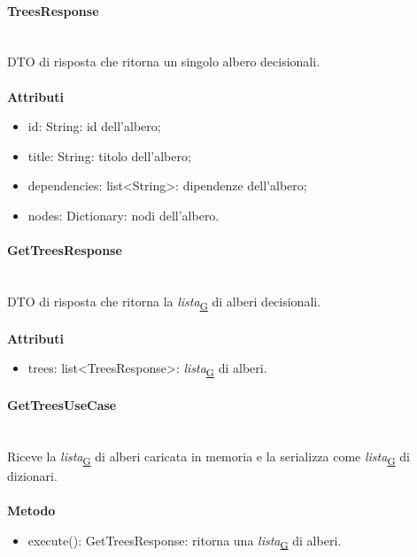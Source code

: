\documentclass[a4paper,12pt]{article}
\begin{document}
                \paragraph{TreesResponse}\mbox{}\\
                    DTO di risposta che ritorna un singolo albero decisionali.\\\\
                    \textbf{Attributi}
                    \begin{itemize}
                        \item {\ttfamily id: String}: id dell'albero;
                        \item {\ttfamily title: String}: titolo dell'albero;
                        \item {\ttfamily dependencies: list<String>}: dipendenze dell'albero;
                        \item {\ttfamily nodes: Dictionary}: nodi dell'albero.
                    \end{itemize}

                \paragraph{GetTreesResponse}\mbox{}\\
                    DTO di risposta che ritorna la \textit{lista}\textsubscript{\href{https://atlasteam9.github.io/Atlas/glossario.html\#Lista}{G}} di alberi decisionali.\\\\
                    \textbf{Attributi}
                    \begin{itemize}
                        \item {\ttfamily trees: list<TreesResponse>}: \textit{lista}\textsubscript{\href{https://atlasteam9.github.io/Atlas/glossario.html\#Lista}{G}} di alberi.
                    \end{itemize}


                \paragraph{GetTreesUseCase}\mbox{}\\
                    Riceve la \textit{lista}\textsubscript{\href{https://atlasteam9.github.io/Atlas/glossario.html\#Lista}{G}} di alberi caricata in memoria e la serializza come \textit{lista}\textsubscript{\href{https://atlasteam9.github.io/Atlas/glossario.html\#Lista}{G}} di dizionari.\\\\
                    \textbf{Metodo}
                    \begin{itemize}
                        \item {\ttfamily execute(): GetTreesResponse}: ritorna una \textit{lista}\textsubscript{\href{https://atlasteam9.github.io/Atlas/glossario.html\#Lista}{G}} di alberi.
                    \end{itemize}
            
\end{document}
